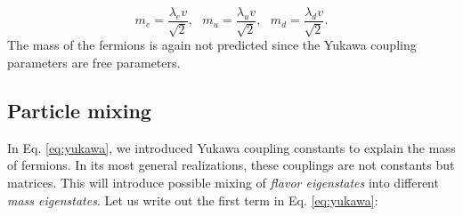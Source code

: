 \begin{equation}
m_e = \frac{\lambda_e v}{\sqrt{2}}, \ \ \ m_u = \frac{\lambda_u v}{\sqrt{2}}, \ \ \ m_d = \frac{\lambda_d v}{\sqrt{2}}.
\end{equation}
The mass of the fermions is again not predicted since the Yukawa coupling parameters are free parameters. 

\subsection{Particle mixing}
\label{subsec:particlemixing}
\iffalse
In Eq. \ref{eq:yukawa}, we introduced Yukawa coupling constants to explain the mass of fermions. In its most general realizations, these couplings are not constants but matrices. This will introduce possible mixing of \textit{flavor eigenstates} into different \textit{mass eigenstates}. Let us write out the first term in Eq. \ref{eq:yukawa}:

